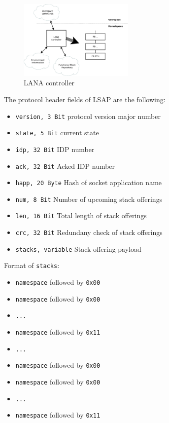 \documentclass[times,10pt,twocolumn]{article}
\begin{document}
\begin{figure}[ht]
  \centering
  \includegraphics[width=0.5\textwidth]{controller.pdf}
  \caption{LANA controller}
  \label{fig2}
\end{figure}

The protocol header fields of LSAP are the following:
\begin{itemize}
        \setlength{\itemsep}{-1mm}
	\item \texttt{version, 3 Bit} protocol version major number
	\item \texttt{state, 5 Bit} current state
	\item \texttt{idp, 32 Bit} IDP number
	\item \texttt{ack, 32 Bit} Acked IDP number
	\item \texttt{happ, 20 Byte} Hash of socket application name
	\item \texttt{num, 8 Bit} Number of upcoming stack offerings
	\item \texttt{len, 16 Bit} Total length of stack offerings
	\item \texttt{crc, 32 Bit} Redundany check of stack offerings
	\item \texttt{stacks, variable} Stack offering payload
\end{itemize}

Format of \texttt{stacks}:
\begin{itemize}
        \setlength{\itemsep}{-1mm}
	\item \texttt{namespace} followed by \texttt{0x00}
	\item \texttt{namespace} followed by \texttt{0x00}
	\item \texttt{...}
	\item \texttt{namespace} followed by \texttt{0x11}
	\item \texttt{...}
	\item \texttt{namespace} followed by \texttt{0x00}
	\item \texttt{namespace} followed by \texttt{0x00}
	\item \texttt{...}
	\item \texttt{namespace} followed by \texttt{0x11}
\end{itemize}
\end{document}
